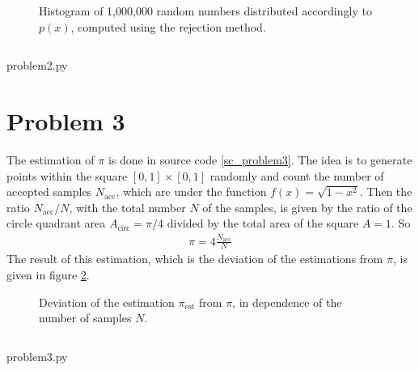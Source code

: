 \documentclass[12pt, a4paper]{article}
\begin{document}
  \begin{figure}[h]
    \centering
    \resizebox{\textwidth}{!}{
      
    }
    \caption{Histogram of 1,000,000 random numbers distributed accordingly to $p(x)$, computed using the rejection method.}
    \label{fig_p_histogram}
  \end{figure}

  \newpage
  \captionsetup{type=listing}
  \inputminted{python}{problem2.py}
  \caption{problem2.py}
  \label{sc_problem2}

  \newpage
  \section*{Problem 3}
  The estimation of $\pi$ is done in source code \ref{sc_problem3}.
  The idea is to generate points within the square $[0, 1] \times [0, 1]$ randomly and count the number of accepted samples $N_\text{acc}$, which are under the function $f(x) = \sqrt{1 - x^2}$.
  Then the ratio $N_\text{acc} / N$, with the total number $N$ of the samples, is given by the ratio of the circle quadrant area $A_\text{circ} = \pi / 4$ divided by the total area of the square $A = 1$.
  So
  \begin{align}
    \pi = 4 \frac{N_\text{acc}}{N}
  \end{align}
  The result of this estimation, which is the deviation of the estimations from $\pi$, is given in figure \ref{fig_pi_est_err}.

  \begin{figure}[h]
    \centering
    \resizebox{\textwidth}{!}{
      
    }
    \caption{Deviation of the estimation $\pi_\text{est}$ from $\pi$, in dependence of the number of samples $N$.}
    \label{fig_pi_est_err}
  \end{figure}

  \newpage
  \captionsetup{type=listing}
  \inputminted{python}{problem3.py}
  \caption{problem3.py}
  \label{sc_problem3}
\end{document}
